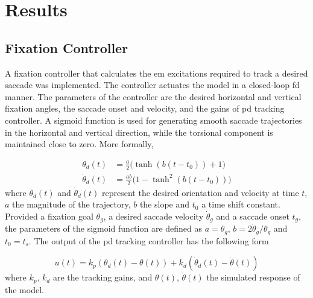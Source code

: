 \documentclass[11pt,a4paper,draft=false]{report}
\begin{document}

\section*{Results}\label{sec:results}

\subsection*{Fixation Controller}\label{sec:fixation-controller}

A fixation controller that calculates the \gls{em} excitations required to track
a desired saccade was implemented. The controller actuates the model in a
closed-loop \gls{fd} manner. The parameters of the controller are the desired
horizontal and vertical fixation angles, the saccade onset and velocity, and the
gains of \gls{pd} tracking controller. A sigmoid function is used for generating
smooth saccade trajectories in the horizontal and vertical direction, while the
torsional component is maintained close to zero. More formally,

\begin{equation}\label{equ:sigmoid}
  \begin{aligned}
    \theta_d(t) &= \frac{a}{2} \Big(\tanh(b (t - t_0)) + 1\Big) \\
    \dot{\theta}_d(t) &= \frac{a b}{2} \Big(1 - \tanh^2(b (t - t_0))\Big)
  \end{aligned}
\end{equation}
% 
where $\theta_d(t)$ and $\dot{\theta}_d(t)$ represent the desired orientation
and velocity at time $t$, $a$ the magnitude of the trajectory, $b$ the slope and
$t_0$ a time shift constant. Provided a fixation goal $\theta_g$, a desired
saccade velocity $\dot{\theta}_g$ and a saccade onset $t_g$, the parameters of
the sigmoid function are defined as $a = \theta_g$,
$b = 2 \dot{\theta}_g / \theta_g$ and $t_0 = t_s$. The output of the \gls{pd}
tracking controller has the following form

\begin{equation}\label{equ:eye-pd-controller}
  u(t) = k_p (\theta_d(t) - \theta(t)) + k_d (\dot{\theta}_d(t) -
  \dot{\theta}(t))
\end{equation}
% 
where $k_p$, $k_d $ are the tracking gains, and $\theta(t)$, $\dot{\theta}(t)$
the simulated response of the model.
\end{document}
